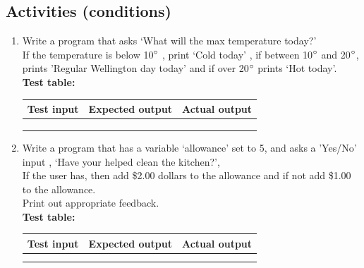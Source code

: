 \documentclass[a4paper,12pt]{article}
\begin{document}
\subsection{Activities (conditions) }
\begin{enumerate}[label=\normalsize \alph*)~~~ , topsep=8pt,itemsep=25pt,partopsep=4pt, parsep=4pt, leftmargin = 0.5cm]
	\item Write a program that asks `What will the max temperature today?'\\
	If the temperature is below 10$\degree$ ,  print `Cold today' , if between 10$\degree$ and 20$\degree$, prints 'Regular Wellington day today' and if over 20$\degree$ prints `Hot today'.\\
	\textbf{Test table:}\\
	\begin{tabular}{| p{5cm} | p{5cm} | p{5cm} |}\hline
	Test input& Expected output & Actual output\\\hline
	&  &  \\\hline
		&  &  \\\hline
			&  &  \\\hline
	\end{tabular}
\item Write a program that has a variable  `allowance' set to 5, and asks a 'Yes/No' input , `Have your helped clean the kitchen?',\\
If the user has, then add \$2.00 dollars to the allowance and if not add \$1.00 to the allowance.\\
Print out appropriate feedback.\\
	\textbf{Test table:}\\
	\begin{tabular}{| p{5cm} | p{5cm} | p{5cm} |}\hline
	Test input& Expected output & Actual output\\\hline
	&  &  \\\hline
	&  &  \\\hline
\end{tabular}\\


\end{enumerate}
\end{document}

